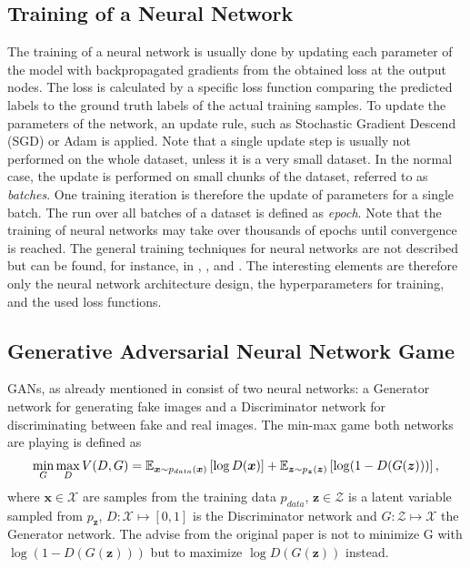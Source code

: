 
\subsection{Training of a Neural Network}
The training of a neural network is usually done by updating each parameter of the model with backpropagated gradients from the obtained loss at the output nodes.
The loss is calculated by a specific loss function comparing the predicted labels to the ground truth labels of the actual training samples.
To update the parameters of the network, an update rule, such as Stochastic Gradient Descend (SGD) or Adam \cite{Kingma2015} is applied.
Note that a single update step is usually not performed on the whole dataset, unless it is a very small dataset. 
In the normal case, the update is performed on small chunks of the dataset, referred to as \emph{batches}.
One training iteration is therefore the update of parameters for a single batch.
The run over all batches of a dataset is defined as \emph{epoch}.
Note that the training of neural networks may take over thousands of epochs until convergence is reached.
The general training techniques for neural networks are not described but can be found, for instance, in \cite{LeCun2006}, \cite{Goodfellow2016}, and \cite{DeepLearning}.
The interesting elements are therefore only the neural network architecture design, the hyperparameters for training, and the used loss functions.



\subsection{Generative Adversarial Neural Network Game}\label{sec:nn_theory_gan}
GANs, as already mentioned in  consist of two neural networks: a Generator network for generating fake images and a Discriminator network for discriminating between fake and real images.
The min-max game both networks are playing is defined as
\begin{equation}\label{eq:nn_theory_gan}
  \underset{G}{\min} \, \underset{D}{\max} \, V(D, G) = \mathbb{E}_{\bm{x} \sim p_{data}(\bm{x})}\left[ \log D(\bm{x}) \right] + 
    \mathbb{E}_{\bm{z} \sim p_{\bm{z}}(\bm{z})}\left[ \log (1 - D(G(\bm{z}))) \right],
\end{equation}
where $\bm{x} \in \mathcal{X}$ are samples from the training data $p_{data}$, $\bm{z} \in \mathcal{Z}$ is a latent variable sampled from $p_{\bm{z}}$, $D: \mathcal{X} \mapsto [0, 1]$ is the Discriminator network and $G: \mathcal{Z} \mapsto \mathcal{X}$ the Generator network.
The advise from the original paper is not to minimize G with $\log (1 - D(G(\bm{z})))$ but to maximize $\log D(G(\bm{z}))$ instead.